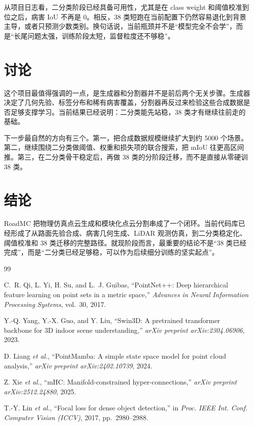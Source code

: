 \documentclass[conference]{IEEEtran}
\begin{document}
从项目日志看，二分类阶段已经具备可用性，尤其是在 class weight 和阈值校准到位之后，病害 IoU 不再是 0。相反，38 类短跑在当前配置下仍然容易退化到背景主导，或者只预测少数类别。换句话说，当前瓶颈并不是“模型完全不会学”，而是“长尾问题太强，训练阶段太短，监督粒度还不够稳”。

\FloatBarrier

\section{讨论}
这个项目最值得强调的一点，是生成器和分割器并不是前后两个无关步骤。生成器决定了几何先验、标签分布和稀有病害覆盖，分割器再反过来检验这些合成数据是否足够支撑学习。当前结果已经说明：二分类能先站稳，38 类才有继续往前走的基础。

下一步最自然的方向有三个。第一，把合成数据规模继续扩大到约 5000 个场景。第二，继续围绕二分类做阈值、权重和损失项的联合搜索，把 mIoU 往更高区间推。第三，在二分类骨干稳定后，再做 38 类的分阶段迁移，而不是直接从零硬训 38 类。

\section{结论}
RoadMC 把物理仿真点云生成和模块化点云分割串成了一个闭环。当前代码库已经形成了从路面先验合成、病害几何生成、LiDAR 观测仿真，到二分类稳定化、阈值校准和 38 类迁移的完整路径。就现阶段而言，最重要的结论不是“38 类已经完成”，而是“二分类已经足够稳，可以作为后续细分训练的坚实起点”。

\begin{thebibliography}{99}

C.~R. Qi, L. Yi, H. Su, and L.~J. Guibas, ``PointNet++: Deep hierarchical feature learning on point sets in a metric space,'' \emph{Advances in Neural Information Processing Systems}, vol.~30, 2017.

Y.-Q. Yang, Y.-X. Guo, and Y. Liu, ``Swin3D: A pretrained transformer backbone for 3D indoor scene understanding,'' \emph{arXiv preprint arXiv:2304.06906}, 2023.

D. Liang \emph{et al.}, ``PointMamba: A simple state space model for point cloud analysis,'' \emph{arXiv preprint arXiv:2402.10739}, 2024.

Z. Xie \emph{et al.}, ``mHC: Manifold-constrained hyper-connections,'' \emph{arXiv preprint arXiv:2512.24880}, 2025.

T.-Y. Lin \emph{et al.}, ``Focal loss for dense object detection,'' in \emph{Proc. IEEE Int. Conf. Computer Vision (ICCV)}, 2017, pp.~2980--2988.

\end{thebibliography}
\end{document}

